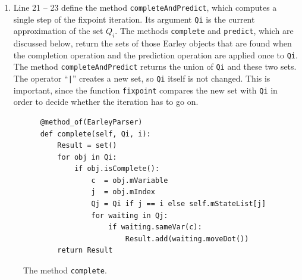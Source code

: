 \begin{enumerate}
\begin{enumerate}[(a)]
            :  It is a function that calls the method
            \texttt{completeAndPredict} for the object \texttt{self}.  The additional argument \texttt{i} of
            \texttt{fixpoint} is passed to this function in every call.  The result of the fixpoint iteration is
            stored as the new value of $Q_i$ in the list \texttt{mStateList}.
      \item Line 15 applies the scanning operation, which initializes the set $Q_{i+1}$.
      \item After the \texttt{for} loop has finished, line 16 checks whether the set $Q_n$, which is the last
            element of the list \texttt{mStateList}, contains the Earley object
            $\pair(\widehat{s} \rightarrow s\mdot, 0)$.  Line 17 and line 19 print the result.
      \end{enumerate}
\item Line 21 -- 23 define the method \texttt{completeAndPredict}, which computes a single step of the fixpoint
      iteration.  Its argument \texttt{Qi} is the current approximation of the set $Q_i$.  The methods
      \texttt{complete} and \texttt{predict}, which are discussed below, return the sets of those Earley objects
      that are found when the completion operation and the prediction operation are applied once to \texttt{Qi}.
      The method \texttt{completeAndPredict} returns the union of \texttt{Qi} and these two sets.  The operator
      ``\texttt{|}'' creates a new set, so \texttt{Qi} itself is not changed.  This is important, since the
      function \texttt{fixpoint} compares the new set with \texttt{Qi} in order to decide whether the iteration
      has to go on.
\end{enumerate}

\begin{figure}[!ht]
\centering
\begin{verbatim}
    @method_of(EarleyParser)
    def complete(self, Qi, i):
        Result = set()
        for obj in Qi:
            if obj.isComplete():
                c  = obj.mVariable
                j  = obj.mIndex
                Qj = Qi if j == i else self.mStateList[j]
                for waiting in Qj:
                    if waiting.sameVar(c):
                        Result.add(waiting.moveDot())
        return Result
\end{verbatim}
\vspace*{-0.3cm}
\caption{The method \texttt{complete}.}
\label{fig:01-Earley-Parser.ipynb:complete}
\end{figure}

